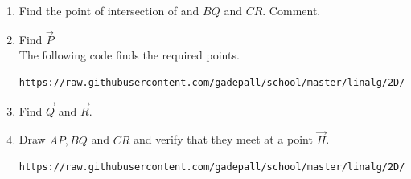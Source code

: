 \documentclass[journal,12pt,twocolumn]{IEEEtran}
\renewcommand\thesection{\arabic{section}}
\begin{document}
\begin{enumerate}[label=\thesection.\arabic*
,ref=\thesection.\theenumi]
\item Find the point of intersection of  and $BQ$ and $CR$. Comment.
\item Find $\vec{P}$
%
\\
\solution The following code finds the required points.
\begin{lstlisting}
https://raw.githubusercontent.com/gadepall/school/master/linalg/2D/python_2d/codes/alt_foot.py
\end{lstlisting}
\item Find $\vec{Q}$ and $\vec{R}$.
\item Draw $AP, BQ$ and $CR$ and verify that they meet at a point 
$\vec{H}$.  
\\
\solution 
\begin{lstlisting}
https://raw.githubusercontent.com/gadepall/school/master/linalg/2D/python_2d/codes/alt_draw.py
\end{lstlisting}

\end{enumerate}
\end{document}
